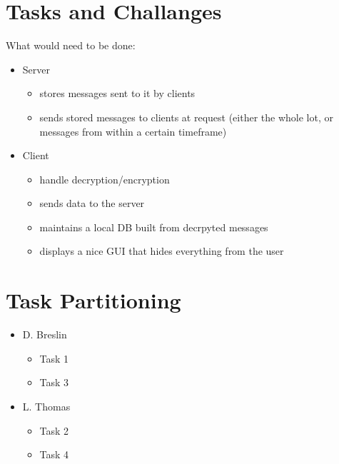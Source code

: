 \section{Tasks and Challanges}
What would need to be done:
\begin{itemize}
\item  Server
    \begin{itemize}
    \item stores messages sent to it by clients
    \item sends stored messages to clients at request (either the whole lot, or
    messages from within a certain timeframe)
    \end{itemize}
\item Client
    \begin{itemize}
    \item handle decryption/encryption
    \item sends data to the server
    \item maintains a local DB built from decrpyted messages
    \item displays a nice GUI that hides everything from the user
    \end{itemize}
\end{itemize}

\section{Task Partitioning}
\begin{itemize}
\item D. Breslin
    \begin{itemize}
    \item Task 1
    \item Task 3
    \end{itemize}
\item L. Thomas
    \begin{itemize}
    \item Task 2
    \item Task 4
    \end{itemize}
\end{itemize}



